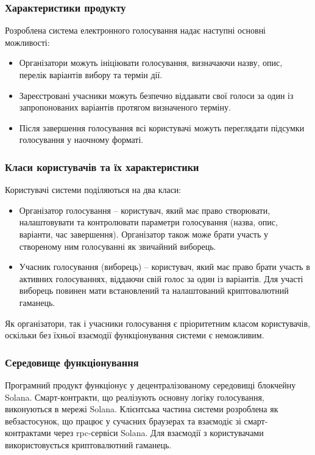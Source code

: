 \documentclass[14pt]{extreport}
\begin{document}
  \subsubsection{Характеристики продукту} 
  
  Розроблена система електронного голосування надає наступні основні можливості:
  
  \begin{itemize}
    \item Організатори можуть ініціювати голосування, визначаючи назву, опис, перелік варіантів вибору та термін дії.
    \item Зареєстровані учасники можуть безпечно віддавати свої голоси за один із запропонованих варіантів протягом визначеного терміну.
    \item Після завершення голосування всі користувачі можуть переглядати підсумки голосування у наочному форматі.
  \end{itemize}
  
  \subsubsection{Класи користувачів та їх характеристики}
  Користувачі системи поділяються на два класи:
  \begin{itemize}
    \item Організатор голосування – користувач, який має право створювати, налаштовувати та контролювати параметри голосування (назва, опис, варіанти, час завершення). Організатор також може брати участь у створеному ним голосуванні як звичайний виборець.
    \item Учасник голосування (виборець) – користувач, який має право брати участь в активних голосуваннях, віддаючи свій голос за один із варіантів. Для участі виборець повинен мати встановлений та налаштований криптовалютний гаманець. 
  \end{itemize}
  
  Як організатори, так і учасники голосування є пріоритетним класом користувачів, оскільки без їхньої взаємодії функціонування системи є неможливим.
  
  \subsubsection{Середовище функціонування}
  Програмний продукт функціонує у децентралізованому середовищі блок\-чейну Solana. Смарт-контракти, що реалізують основну логіку голосування, виконуються в мережі Solana. Клієнтська частина системи розроблена як вебзастосунок, що працює у сучасних браузерах та взаємодіє зі смарт-контрактами через \gls{rpc}-сервіси Solana. Для взаємодії з користувачами використовується криптовалютний гаманець.
\end{document}
